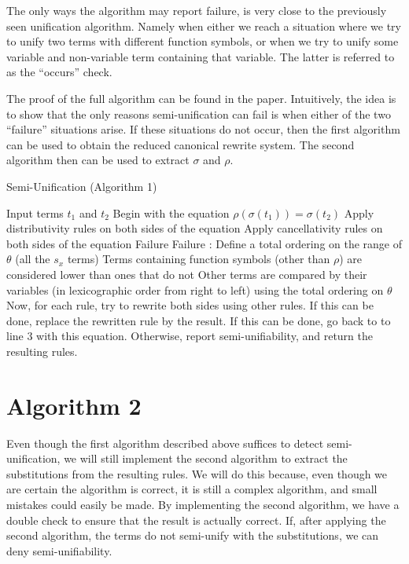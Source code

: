The only ways the algorithm may report failure, is very close to the previously seen unification algorithm. Namely when either we reach a situation where we try to unify two terms with different function symbols, or when we try to unify some variable and non-variable term containing that variable. The latter is referred to as the ``occurs'' check. 

The proof of the full algorithm can be found in the paper\cite{SemiUnification}. Intuitively, the idea is to show that the only reasons semi-unification can fail is when either of the two ``failure'' situations arise. If these situations do not occur, then the first algorithm can be used to obtain the reduced canonical rewrite system. The second algorithm then can be used to extract $\sigma$ and $\rho$.  

\begin{algorithm}
\caption{Semi-Unification (Algorithm 1)}
\label{semiunification1}
\begin{algorithmic}[1]
\STATE Input terms $t_1$ and $t_2$
\STATE Begin with the equation $\rho(\sigma(t_1)) = \sigma(t_2)$
\STATE Apply distributivity rules on both sides of the equation
\STATE Apply cancellativity rules on both sides of the equation
    \RETURN Failure
    \RETURN Failure
  \ENDIF
\ENDFOR
\STATE {}:
\STATE Define a total ordering on the range of $\theta$ (all the $s_x$ terms)
\STATE Terms containing function symbols (other than $\rho$) are considered lower than ones that do not
\STATE Other terms are compared by their variables (in lexicographic order from right to left) using the total ordering on $\theta$ 
\STATE Now, for each rule, try to rewrite both sides using other rules. If this can be done, replace the rewritten rule by the result.
\STATE If this can be done, go back to to line 3 with this equation. 
\STATE Otherwise, report semi-unifiability, and return the resulting rules. 
\end{algorithmic}
\end{algorithm}

\section{Algorithm 2} 
Even though the first algorithm described above suffices to detect semi-unification, we will still implement the second algorithm to extract the substitutions from the resulting rules. We will do this because, even though we are certain the algorithm is correct, it is still a complex algorithm, and small mistakes could easily be made. By implementing the second algorithm, we have a double check to ensure that the result is actually correct. If, after applying the second algorithm, the terms do not semi-unify with the substitutions, we can deny semi-unifiability.
